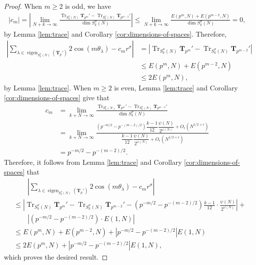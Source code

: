\documentclass[11pt,letterpaper,reqno]{amsart}
\theoremstyle{definition}
\numberwithin{equation}{section}
\numberwithin{figure}{section}
\numberwithin{table}{section}
\newcommand{\eigen}{\operatorname{eigen}}
\begin{document}
\begin{proof}
When $m \geq 2$ is odd, we have
\begin{align} \label{eqn:value-of-cm-for-m-odd}
    |c_m| = \left| \lim_{N+k\to\infty} \frac{ \operatorname{Tr}_{S_k^{\sigma}(N)}\mathbf{T}_{p^m}' - \operatorname{Tr}_{S_k^{\sigma}(N)}\mathbf{T}_{p^{m-2}}'}{\dim S_k^{\sigma}(N)} \right| \leq \lim_{N+k\to\infty} \frac{E(p^m, N) + E(p^{m - 2}, N) }{\dim S_k^{\sigma}(N)} = 0,
\end{align}
by Lemma \ref{lem:trace} and Corollary \ref{cor:dimensions-of-spaces}. Therefore,
\begin{align}
    \left| \sum_{\lambda \in \eigen_{S_k^\sigma(N)}(\mathbf{T}_p')} 2\cos(m\theta_\lambda) - c_m r^\sigma \right| &= \left| \operatorname{Tr}_{S_k^{\sigma}(N)} \mathbf{T}_{p^m}'
-
\operatorname{Tr}_{S_k^{\sigma}(N)} \mathbf{T}_{p^{m-2}}'  \right| \\
&\leq E(p^m, N) + E(p^{m - 2}, N) \\
&\leq 2 E(p^m, N),
\end{align}
by Lemma \ref{lem:trace}. When $m \geq 2$ is even, Lemma \ref{lem:trace} and Corollary \ref{cor:dimensions-of-spaces} give that
\begin{align}
    c_m  &= \lim_{k + N \rightarrow \infty } \frac{\operatorname{Tr}_{S_k^{\sigma}(N)}\mathbf{T}_{p^m}' - \operatorname{Tr}_{S_k^{\sigma}(N)}\mathbf{T}_{p^{m-2}}' }{ \dim S_k^{\sigma}(N)} \\
    &= \lim_{k + N \rightarrow \infty }  \frac{ 
        \left( p^{-m/2}-p^{-(m-2)/2} \right) \dfrac{k-1}{12}\dfrac{\psi(N)}{2^{\omega(N)}} 
        + O_\epsilon \! \left( N^{1/2+\epsilon} \right)
    }{ 
        \dfrac{k-1}{12}\dfrac{\psi(N)}{2^{\omega(N)}} 
        + O_\epsilon \! \left( N^{1/2+\epsilon} \right) 
    }  \\
    &= p^{-m/2}-p^{-(m-2)/2}. \label{eqn:value-of-cm-for-m-even}
\end{align}
Therefore, it follows from Lemma \ref{lem:trace} and Corollary \ref{cor:dimensions-of-spaces} that
\begin{align}
    & \qquad \left| \sum_{\lambda \in \eigen_{S_k^\sigma(N)}(\mathbf{T}_p')} 2\cos(m\theta_\lambda) - c_m r^\sigma \right| \\
    &\leq \left| \operatorname{Tr}_{S_k^{\sigma}(N)} \mathbf{T}_{p^m}'
-
\operatorname{Tr}_{S_k^{\sigma}(N)} \mathbf{T}_{p^{m-2}}' - \left( p^{-m/2}-p^{-(m-2)/2} \right) \frac{k - 1}{12} \cdot \frac{\psi(N)}{2^{\omega(N)}} \right| +\\
&\qquad \left| \left( p^{-m/2}-p^{-(m-2)/2} \right)   \cdot E(1, N) \right| \\
&\leq E(p^m, N) + E(p^{m - 2}, N) + \left|  p^{-m/2}-p^{-(m-2)/2}  \right| E(1, N) \\
&\leq 2 E(p^m, N) + \left|  p^{-m/2}-p^{-(m-2)/2}  \right|  E(1, N),
\end{align}
which proves the desired result.
\end{proof}
\end{document}
